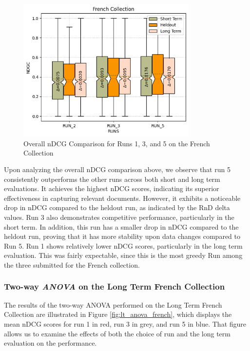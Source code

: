\begin{figure}[!h]
\centering
\includegraphics[width=0.8\textwidth]{figure/StatisticalAnalysis/nDCG_french_boxplot.png}
\caption{Overall \ac{nDCG} Comparison for Runs 1, 3, and 5 on the French Collection}
\label{fig:overall_ndcg_french_boxplot}
\end{figure}

Upon analyzing the overall \ac{nDCG} comparison above, we observe that run 5 consistently outperforms the other runs across both short and long term evaluations. 
It achieves the highest \ac{nDCG} scores, indicating its superior effectiveness in capturing relevant documents. 
However, it exhibits a noticeable drop in \ac{nDCG} compared to the heldout run, as indicated by the \ac{RnD} delta values. 
Run 3 also demonstrates competitive performance, particularly in the short term. 
In addition, this run has a smaller drop in \ac{nDCG} compared to the heldout run, proving that it has more stability upon data changes compared to Run 5.
Run 1 shows relatively lower \ac{nDCG} scores, particularly in the long term evaluation. 
This was fairly expectable, since this is the most greedy Run among the three submitted for the French collection.


\newpage
\enlargethispage{8\baselineskip}
\subsubsection{Two-way \textit{ANOVA} on the Long Term French Collection} \label{sec:anova_fr_lt}

The results of the two-way \ac{ANOVA} performed on the Long Term French Collection are illustrated in Figure \ref{fig:lt_anova_french}, which displays the mean \ac{nDCG} scores for run 1 in red, run 3 in grey, and run 5 in blue.
That figure allows us to examine the effects of both the choice of run and the long term evaluation on the performance.

